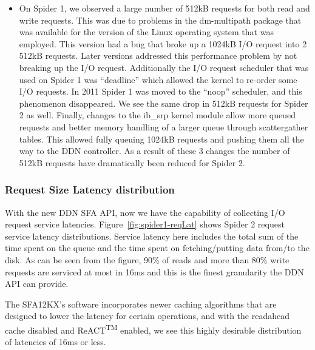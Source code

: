 \begin{itemize}
\item   On Spider 1, we observed a large number of 512kB requests for both read
and write requests. This was due to problems in the dm-multipath \cite{mpath} 
package that was available for the version of the Linux operating system that was 
employed. This version had a bug that broke up a 1024kB I/O request into 2 
512kB requests. Later versions addressed this performance problem by not breaking 
up the I/O request. Additionally the I/O request scheduler that was used on 
Spider 1 was ``deadline'' which allowed the kernel to re-order some I/O requests. 
In 2011 Spider 1 was moved to the ``noop'' scheduler, and this phenomenon 
disappeared. We see the same drop in 512kB requests for Spider 2 as well. Finally, 
changes to the ib\_srp kernel module allow more queued requests and better memory 
handling of a larger queue through scatter\/gather tables. This allowed fully 
queuing 1024kB requests and pushing them all the way to the DDN controller. As 
a result of these 3 changes the number of 512kB requests have dramatically been 
reduced for Spider 2.
\end{itemize}

\subsubsection{Request Size Latency distribution}

With the new DDN SFA API, now we have the capability of collecting I/O request
service latencies. Figure~\ref{fig:spider1-reqLat} shows Spider 2 request service
latency distributions. Service latency here includes the total sum of the time
spent on the queue and the time spent on fetching/putting data from/to the
disk. As can be seen from the figure, 90\% of reads and more than 80\% write
requests are serviced at most in 16ms and this is the finest granularity the
DDN API can provide. 

The SFA12KX's software incorporates newer caching algorithms that are designed to 
lower the latency for certain operations, and with the readahead cache disabled 
and ReACT\textsuperscript{TM} enabled, we see this highly desirable distribution 
of latencies of 16ms or less.

